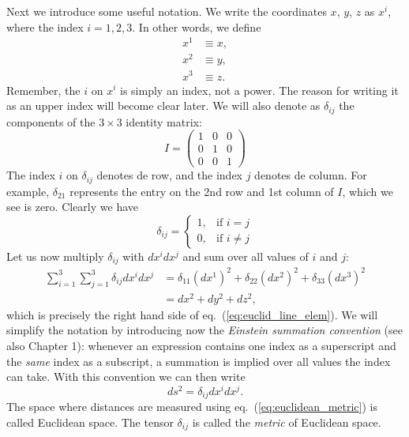\documentclass[11pt, a4paper,oneside,openright]{book}
\numberwithin{equation}{section}
\begin{document}
Next we introduce some useful notation. We write the coordinates $x$, $y$, $z$ as $x^i$, where the index $i=1,2,3$. In other words, we define
\begin{equation}
\begin{split}
x^1&\equiv x,\\
x^2&\equiv y,\\
x^3&\equiv z.
\end{split}
\end{equation}
Remember, the $i$ on $x^i$ is simply an index, not a power. The reason for writing it as an upper index will become clear later. We will also denote as $\delta_{ij}$ the components of the $3\times3$ identity matrix:
\begin{equation}
I=\left( \begin{array}{ccc} 1 & 0 & 0 \\ 
0 & 1 & 0 \\
0 & 0 & 1 \end{array} \right)
\end{equation}
The index $i$ on $\delta_{ij}$ denotes de row, and the index $j$ denotes de column. For example, $\delta_{21}$ represents the entry on the 2nd row and 1st column of $I$, which we see is zero. Clearly we have
\begin{equation}
\delta_{ij}=\begin{cases} 1, & \mbox{if $i=j$} \\ 
0, & \mbox{if $i\neq j$} \end{cases}
\end{equation}
Let us now multiply $\delta_{ij}$ with $dx^i dx^j$ and sum over all values of $i$ and $j$:
\begin{equation}
\begin{split}
\sum_{i=1}^3\sum_{j=1}^3 \delta_{ij}dx^i dx^j &= \delta_{11}(dx^1)^2+\delta_{22}(dx^2)^2+\delta_{33}(dx^3)^2\\
&= dx^2+dy^2+dz^2,
\end{split}
\end{equation}
which is precisely the right hand side of eq.\ (\ref{eq:euclid_line_elem}). We will simplify the notation by introducing now the {\it Einstein summation convention} (see also Chapter 1): whenever an expression contains one index as a superscript and the {\it same} index as a subscript, a summation is implied over all values the index can take. With this convention we can then write
\begin{equation} \label{eq:euclidean_metric}
ds^2=\delta_{ij}dx^i dx^j.
\end{equation}
The space where distances are measured using eq.\ (\ref{eq:euclidean_metric}) is called Euclidean space. The tensor $\delta_{ij}$ is called the {\it metric} of Euclidean space.
\end{document}
